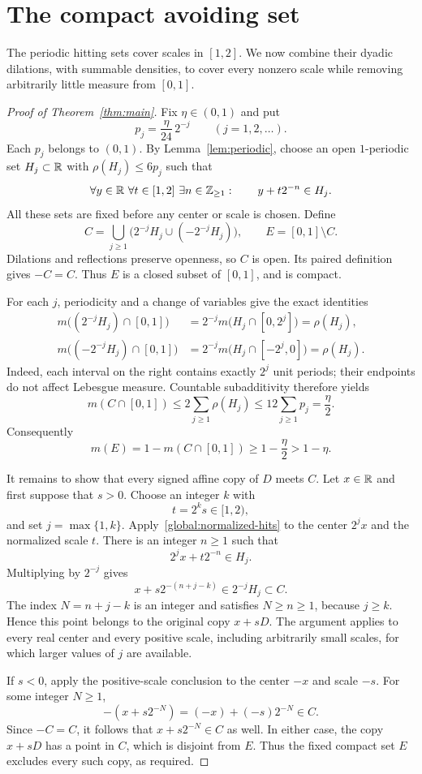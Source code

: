 \section{The compact avoiding set}\label{sec:global}

The periodic hitting sets cover scales in $[1,2]$. We now combine their
dyadic dilations, with summable densities, to cover every nonzero scale
while removing arbitrarily little measure from $[0,1]$.

\begin{proof}[Proof of Theorem~\ref{thm:main}]
Fix $\eta\in(0,1)$ and put
\[
 p_j=\frac{\eta}{24}\,2^{-j}\qquad(j=1,2,\ldots).
\]
Each $p_j$ belongs to $(0,1)$. By Lemma~\ref{lem:periodic}, choose an
open $1$-periodic set $H_j\subset\mathbb R$ with $\rho(H_j)\le6p_j$ such that
\begin{equation}\label{global:normalized-hits}
 \forall y\in\mathbb R\ \forall t\in[1,2]\ \exists n\in\mathbb Z_{\ge1}:
 \qquad y+t2^{-n}\in H_j.
\end{equation}
All these sets are fixed before any center or scale is chosen. Define
\[
 C=\bigcup_{j\ge1}\bigl(2^{-j}H_j\cup(-2^{-j}H_j)\bigr),
 \qquad E=[0,1]\setminus C.
\]
Dilations and reflections preserve openness, so $C$ is open. Its paired
definition gives $-C=C$. Thus $E$ is a closed subset of $[0,1]$, and is
compact.

For each $j$, periodicity and a change of variables give the exact
identities
\begin{align*}
 m\bigl((2^{-j}H_j)\cap[0,1]\bigr)
 &=2^{-j}m\bigl(H_j\cap[0,2^j]\bigr)=\rho(H_j),\\
 m\bigl((-2^{-j}H_j)\cap[0,1]\bigr)
 &=2^{-j}m\bigl(H_j\cap[-2^j,0]\bigr)=\rho(H_j).
\end{align*}
Indeed, each interval on the right contains exactly $2^j$ unit periods;
their endpoints do not affect Lebesgue measure. Countable subadditivity
therefore yields
\[
 m(C\cap[0,1])\le2\sum_{j\ge1}\rho(H_j)
     \le12\sum_{j\ge1}p_j=\frac{\eta}{2}.
\]
Consequently
\[
 m(E)=1-m(C\cap[0,1])\ge1-\frac{\eta}{2}>1-\eta.
\]

It remains to show that every signed affine copy of $D$ meets $C$.
Let $x\in\mathbb R$ and first suppose that $s>0$. Choose an integer $k$ with
\[
 t=2^k s\in[1,2),
\]
and set $j=\max\{1,k\}$. Apply~\eqref{global:normalized-hits} to the
center $2^j x$ and the normalized scale $t$. There is an integer $n\ge1$
such that
\[
 2^j x+t2^{-n}\in H_j.
\]
Multiplying by $2^{-j}$ gives
\[
 x+s2^{-(n+j-k)}\in2^{-j}H_j\subset C.
\]
The index $N=n+j-k$ is an integer and satisfies $N\ge n\ge1$, because
$j\ge k$. Hence this point belongs to the original copy $x+sD$.
The argument applies to every real center and every positive scale,
including arbitrarily small scales, for which larger values of $j$ are
available.

If $s<0$, apply the positive-scale conclusion to the center $-x$ and
scale $-s$. For some integer $N\ge1$,
\[
 -(x+s2^{-N})=(-x)+(-s)2^{-N}\in C.
\]
Since $-C=C$, it follows that $x+s2^{-N}\in C$ as well. In either case,
the copy $x+sD$ has a point in $C$, which is disjoint from $E$.
Thus the fixed compact set $E$ excludes every such copy, as required.
\end{proof}
